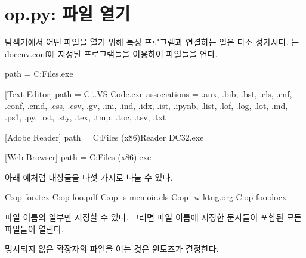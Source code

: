 \coderead[file=tlconf.cmd, language=batch, fontsize=\footnotesize]

\section{op.py: 파일 열기}

탐색기에서 어떤 파일을 열기 위해 특정 프로그램과 연결하는 일은 다소 성가시다.
는 docenv.conf에 지정된 프로그램들을 이용하여 파일들을 연다.

\begin{codewrite}
[SumatraPDF]
path = C:\Program Files\SumatraPDF\SumatraPDF.exe

[Text Editor]
path = C:\...\Microsoft VS Code\code.exe
associations = .aux, .bib, .bst, .cls, .cnf, .conf, .cmd, .css, .csv, .gv,
 .ini, .ind, .idx, .ist, .ipynb, .list, .lof, .log, .lot, .md, .ps1, .py, 
 .rst, .sty, .tex, .tmp, .toc, .tsv, .txt

[Adobe Reader]
path = C:\Program Files (x86)\Adobe\Acrobat Reader DC\Reader\AcroRd32.exe

[Web Browser]
path = C:\Program Files (x86)\Google\Chrome\Application\chrome.exe
\end{codewrite}
\coderead[language=ini] 

아래 예처럼 대상들을 다섯 가지로 나눌 수 있다.

\begin{code}
C:\>op foo.tex
C:\>op foo.pdf
C:\>op -s memoir.cls 
C:\>op -w ktug.org
C:\>op foo.docx
\end{code}

파일 이름의 일부만 지정할 수 있다. 그러면 파일 이름에 지정한 문자들이 포함된 모든 파일들이 열린다.

명시되지 않은 확장자의 파일을 여는 것은 윈도즈가 결정한다.


